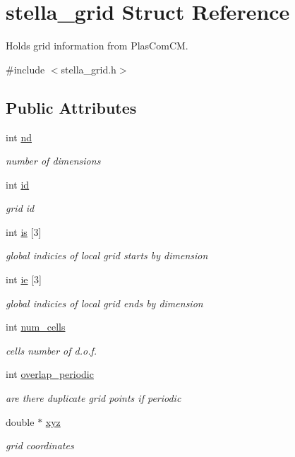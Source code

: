 \hypertarget{structstella__grid}{}\section{stella\+\_\+grid Struct Reference}
\label{structstella__grid}


Holds grid information from Plas\+Com\+CM.  




{\ttfamily \#include $<$stella\+\_\+grid.\+h$>$}

\subsection*{Public Attributes}
\begin{DoxyCompactItemize}
\item 
int \mbox{\hyperlink{structstella__grid_a0ddfdd7b1459b3087fa1d967af299007}{nd}}
\begin{DoxyCompactList}\small\item\em number of dimensions \end{DoxyCompactList}\item 
int \mbox{\hyperlink{structstella__grid_ab61ffb667d6d32a3b629bab6e513ffb8}{id}}
\begin{DoxyCompactList}\small\item\em grid id \end{DoxyCompactList}\item 
int \mbox{\hyperlink{structstella__grid_a7604c64f87035bf528be4c95b25b16cc}{is}} \mbox{[}3\mbox{]}
\begin{DoxyCompactList}\small\item\em global indicies of local grid starts by dimension \end{DoxyCompactList}\item 
int \mbox{\hyperlink{structstella__grid_a53051f7c69d6443f1dda4c6e9bc9aba1}{ie}} \mbox{[}3\mbox{]}
\begin{DoxyCompactList}\small\item\em global indicies of local grid ends by dimension \end{DoxyCompactList}\item 
int \mbox{\hyperlink{structstella__grid_afd6a2ee54de531c805cc15b644491d9f}{num\+\_\+cells}}
\begin{DoxyCompactList}\small\item\em cells number of d.\+o.\+f. \end{DoxyCompactList}\item 
int \mbox{\hyperlink{structstella__grid_ab8330b0c4c1613de977e5debdb94eff0}{overlap\+\_\+periodic}}
\begin{DoxyCompactList}\small\item\em are there duplicate grid points if periodic \end{DoxyCompactList}\item 
double $\ast$ \mbox{\hyperlink{structstella__grid_a26cdb92edaa442067ef07100540086db}{xyz}}
\begin{DoxyCompactList}\small\item\em grid coordinates \end{DoxyCompactList}\end{DoxyCompactItemize}


